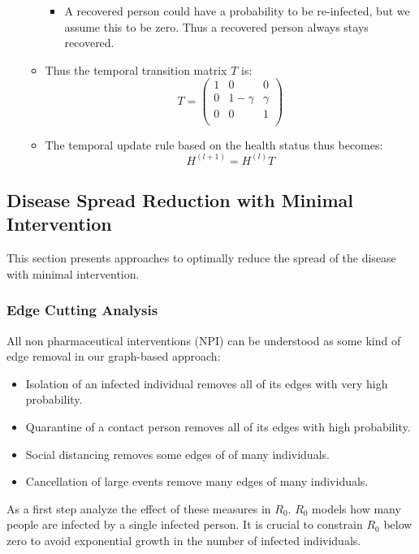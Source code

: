 \documentclass[]{article}
\begin{document}
\begin{itemize}
\begin{itemize}
\begin{itemize}
			\item A recovered person could have a probability to be re-infected, but we assume this to be zero. Thus a recovered person always stays recovered.
		\end{itemize}
		\item Thus the temporal transition matrix $T$ is:
		\begin{equation}
			T = 
			\begin{pmatrix}
				1 &     0    & 0      \\
				0 & 1-\gamma & \gamma \\
				0 &     0    & 1      \\
			\end{pmatrix}
		\end{equation}
		\item The temporal update rule based on the health status thus becomes:
		\begin{equation}
			H^{(l+1)} = H^{(l)} T
		\end{equation}
	\end{itemize}
\end{itemize}

\subsection{Disease Spread Reduction with Minimal Intervention}
This section presents approaches to optimally reduce the spread of the disease with minimal intervention.

\subsubsection{Edge Cutting Analysis}
All non pharmaceutical interventions (NPI) can be understood as some kind of edge removal in our graph-based approach:
\begin{itemize}
	\item Isolation of an infected individual removes all of its edges with very high probability.
	\item Quarantine of a contact person removes all of its edges with high probability.
	\item Social distancing removes some edges of of many individuals.
	\item Cancellation of large events remove many edges of many individuals.
\end{itemize}
As a first step analyze the effect of these measures in $R_0$.
$R_0$ models how many people are infected by a single infected person.
It is crucial to constrain $R_0$ below zero to avoid exponential growth in the number of infected individuals.
\end{document}
